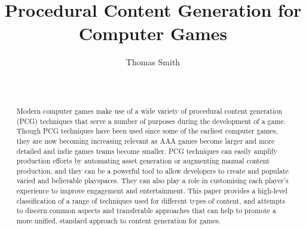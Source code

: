 \documentclass{acm_proc_article-sp}
\begin{document}
\title{Procedural Content Generation for Computer Games}

\author{
\alignauthor
Thomas Smith\\
       \\
       \\
}

\maketitle
\begin{abstract}
Modern computer games make use of a wide variety of procedural content generation (PCG) techniques that serve a number of purposes during the development of a game. Though PCG techniques have been used since some of the earliest computer games\cite{elite}, they are now becoming increasing relevant as AAA games become larger and more detailed and indie games teams become smaller. PCG techniques can easily amplify production efforts by automating asset generation or augmenting manual content production, and they can be a powerful tool to allow developers to create and populate varied and believable playspaces. They can also play a role in customising each player's experience to improve engagement and entertainment. This paper provides a high-level classification of a range of techniques used for different types of content, and attempts to discern common aspects and transferable approaches that can help to promote a more unified, standard approach to content generation for games. 






\end{abstract}
\end{document}
